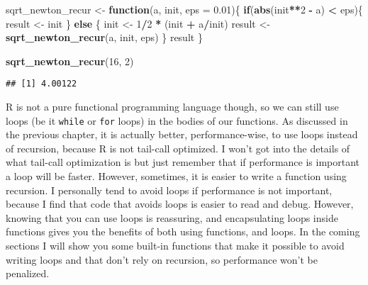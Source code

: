 \documentclass[
]{article}
\newenvironment{Shaded}{\begin{snugshade}}{\end{snugshade}}
\newcommand{\ControlFlowTok}[1]{\textcolor[rgb]{0.13,0.29,0.53}{\textbf{#1}}}
\newcommand{\DataTypeTok}[1]{\textcolor[rgb]{0.13,0.29,0.53}{#1}}
\newcommand{\DecValTok}[1]{\textcolor[rgb]{0.00,0.00,0.81}{#1}}
\newcommand{\FloatTok}[1]{\textcolor[rgb]{0.00,0.00,0.81}{#1}}
\newcommand{\KeywordTok}[1]{\textcolor[rgb]{0.13,0.29,0.53}{\textbf{#1}}}
\newcommand{\NormalTok}[1]{#1}
\newcommand{\OperatorTok}[1]{\textcolor[rgb]{0.81,0.36,0.00}{\textbf{#1}}}
\newcommand{\StringTok}[1]{\textcolor[rgb]{0.31,0.60,0.02}{#1}}
\begin{document}
\begin{Shaded}
\begin{Highlighting}[]
\NormalTok{sqrt\_newton\_recur \textless{}{-}}\StringTok{ }\ControlFlowTok{function}\NormalTok{(a, init, }\DataTypeTok{eps =} \FloatTok{0.01}\NormalTok{)\{}
    \ControlFlowTok{if}\NormalTok{(}\KeywordTok{abs}\NormalTok{(init}\OperatorTok{**}\DecValTok{2} \OperatorTok{{-}}\StringTok{ }\NormalTok{a) }\OperatorTok{\textless{}}\StringTok{ }\NormalTok{eps)\{}
\NormalTok{        result \textless{}{-}}\StringTok{ }\NormalTok{init}
\NormalTok{    \} }\ControlFlowTok{else}\NormalTok{ \{}
\NormalTok{        init \textless{}{-}}\StringTok{ }\DecValTok{1}\OperatorTok{/}\DecValTok{2} \OperatorTok{*}\StringTok{ }\NormalTok{(init }\OperatorTok{+}\StringTok{ }\NormalTok{a}\OperatorTok{/}\NormalTok{init)}
\NormalTok{        result \textless{}{-}}\StringTok{ }\KeywordTok{sqrt\_newton\_recur}\NormalTok{(a, init, eps)}
\NormalTok{    \}}
\NormalTok{    result}
\NormalTok{\}}
\end{Highlighting}
\end{Shaded}

\begin{Shaded}
\begin{Highlighting}[]
\KeywordTok{sqrt\_newton\_recur}\NormalTok{(}\DecValTok{16}\NormalTok{, }\DecValTok{2}\NormalTok{)}
\end{Highlighting}
\end{Shaded}

\begin{verbatim}
## [1] 4.00122
\end{verbatim}

R is not a pure functional programming language though, so we can still use loops (be it \texttt{while} or
\texttt{for} loops) in the bodies of our functions. As discussed in the previous chapter, it is actually
better, performance-wise, to use loops instead of recursion, because R is not tail-call optimized.
I won't got into the details of what tail-call optimization is but just remember that if
performance is important a loop will be faster. However, sometimes, it is easier to write a
function using recursion. I personally tend to avoid loops if performance is not important,
because I find that code that avoids loops is easier to read and debug. However, knowing that
you can use loops is reassuring, and encapsulating loops inside functions gives you the benefits of
both using functions, and loops. In the coming sections I will show you some built-in functions
that make it possible to avoid writing loops and that don't rely on recursion, so performance
won't be penalized.
\end{document}
